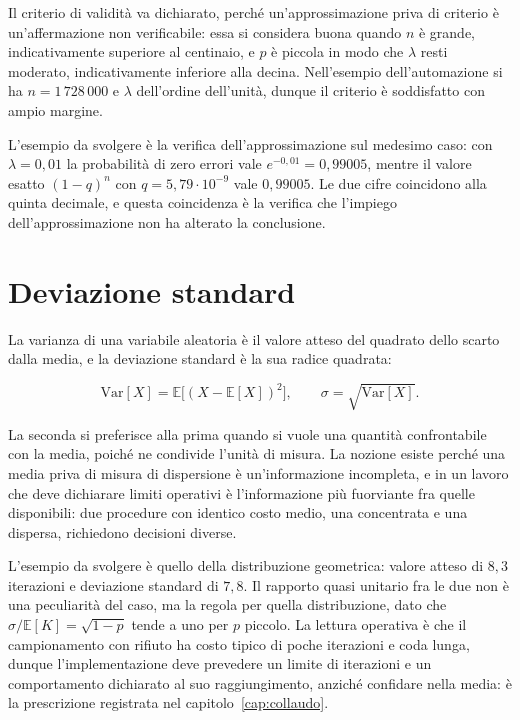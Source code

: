 Il criterio di validità va dichiarato, perché un'approssimazione priva di criterio è un'affermazione non verificabile: essa si considera buona quando $n$ è grande, indicativamente superiore al centinaio, e $p$ è piccola in modo che $\lambda$ resti moderato, indicativamente inferiore alla decina. Nell'esempio dell'automazione si ha $n = 1\,728\,000$ e $\lambda$ dell'ordine dell'unità, dunque il criterio è soddisfatto con ampio margine.

L'esempio da svolgere è la verifica dell'approssimazione sul medesimo caso: con $\lambda = 0{,}01$ la probabilità di zero errori vale $e^{-0{,}01} = 0{,}99005$, mentre il valore esatto $(1-q)^n$ con $q = 5{,}79 \cdot 10^{-9}$ vale $0{,}99005$. Le due cifre coincidono alla quinta decimale, e questa coincidenza è la verifica che l'impiego dell'approssimazione non ha alterato la conclusione.

\section{Deviazione standard}

La varianza di una variabile aleatoria è il valore atteso del quadrato dello scarto dalla media, e la deviazione standard è la sua radice quadrata:

\begin{equation}
\mathrm{Var}[X] = \mathbb{E}\big[(X - \mathbb{E}[X])^2\big], \qquad \sigma = \sqrt{\mathrm{Var}[X]}.
\end{equation}

La seconda si preferisce alla prima quando si vuole una quantità confrontabile con la media, poiché ne condivide l'unità di misura. La nozione esiste perché una media priva di misura di dispersione è un'informazione incompleta, e in un lavoro che deve dichiarare limiti operativi è l'informazione più fuorviante fra quelle disponibili: due procedure con identico costo medio, una concentrata e una dispersa, richiedono decisioni diverse.

L'esempio da svolgere è quello della distribuzione geometrica: valore atteso di $8{,}3$ iterazioni e deviazione standard di $7{,}8$. Il rapporto quasi unitario fra le due non è una peculiarità del caso, ma la regola per quella distribuzione, dato che $\sigma / \mathbb{E}[K] = \sqrt{1-p}$ tende a uno per $p$ piccolo. La lettura operativa è che il campionamento con rifiuto ha costo tipico di poche iterazioni e coda lunga, dunque l'implementazione deve prevedere un limite di iterazioni e un comportamento dichiarato al suo raggiungimento, anziché confidare nella media: è la prescrizione registrata nel capitolo~\ref{cap:collaudo}.
